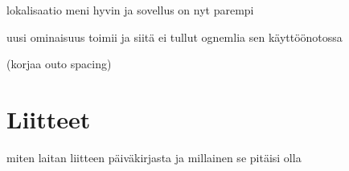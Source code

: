 \documentclass[11pt,a4paper,titlepage,oneside]{article}
\begin{document}
lokalisaatio meni hyvin ja sovellus on nyt parempi
\medskip


uusi ominaisuus toimii ja siitä ei tullut ognemlia sen käyttöönotossa
\medskip





\newpage




(korjaa outo spacing)








\section{Liitteet}               %

miten laitan liitteen päiväkirjasta ja millainen se pitäisi olla
\end{document}
